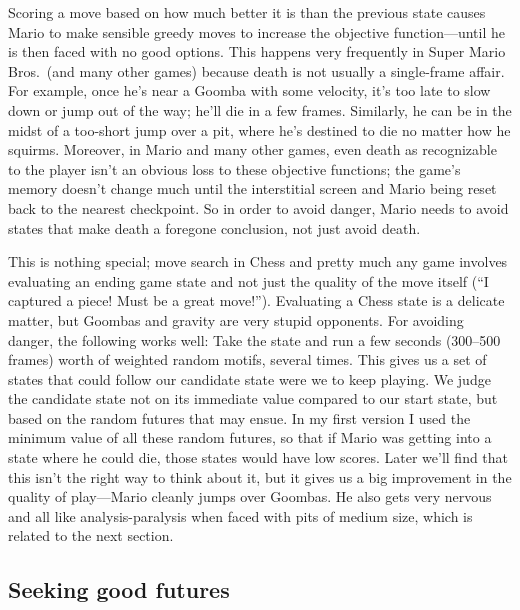 \documentclass[twocolumn]{article}
\begin{document}
Scoring a move based on how much better it is than the previous state
causes Mario to make sensible greedy moves to increase the objective
function---until he is then faced with no good options. This happens
very frequently in Super Mario Bros.~(and many other games) because
death is not usually a single-frame affair. For example, once he's
near a Goomba with some velocity, it's too late to slow down or jump
out of the way; he'll die in a few frames. Similarly, he can be in the
midst of a too-short jump over a pit, where he's destined to die no
matter how he squirms. Moreover, in Mario and many other games, even
death as recognizable to the player isn't an obvious loss to these
objective functions; the game's memory doesn't change much until the
interstitial screen and Mario being reset back to the nearest
checkpoint. So in order to avoid danger, Mario needs to avoid states
that make death a foregone conclusion, not just avoid death.

This is nothing special; move search in Chess and pretty much any game
involves evaluating an ending game state and not just the quality of
the move itself (``I captured a piece! Must be a great move!'').
Evaluating a Chess state is a delicate matter, but Goombas and gravity
are very stupid opponents. For avoiding danger, the following works
well: Take the state and run a few seconds (300--500 frames) worth of
weighted random motifs, several times. This gives us a set of states
that could follow our candidate state were we to keep playing. We
judge the candidate state not on its immediate value compared to our
start state, but based on the random futures that may ensue. In my
first version I used the minimum value of all these random futures, so
that if Mario was getting into a state where he could die, those
states would have low scores. Later we'll find that this isn't the
right way to think about it, but it gives us a big improvement in the
quality of play---Mario cleanly jumps over Goombas. He also gets very
nervous and all like analysis-paralysis when faced with pits of medium
size, which is related to the next section. %

\subsection{Seeking good futures}
\end{document}
